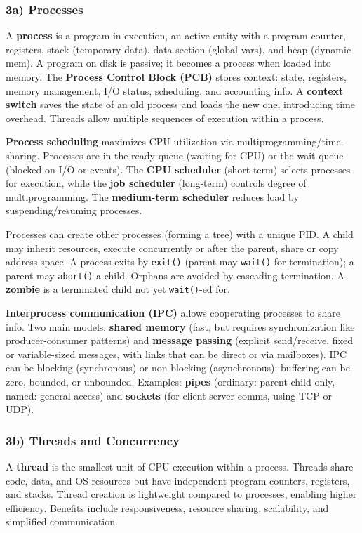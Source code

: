 \subsubsection*{3a) Processes}
A \textbf{process} is a program in execution, an active entity with a program counter, registers, stack (temporary data), data section (global vars), and heap (dynamic mem). A program on disk is passive; it becomes a process when loaded into memory. The \textbf{Process Control Block (PCB)} stores context: state, registers, memory management, I/O status, scheduling, and accounting info. A \textbf{context switch} saves the state of an old process and loads the new one, introducing time overhead. Threads allow multiple sequences of execution within a process.

\textbf{Process scheduling} maximizes CPU utilization via multiprogramming/time-sharing. Processes are in the ready queue (waiting for CPU) or the wait queue (blocked on I/O or events). The \textbf{CPU scheduler} (short-term) selects processes for execution, while the \textbf{job scheduler} (long-term) controls degree of multiprogramming. The \textbf{medium-term scheduler} reduces load by suspending/resuming processes.

Processes can create other processes (forming a tree) with a unique PID. A child may inherit resources, execute concurrently or after the parent, share or copy address space. A process exits by \texttt{exit()} (parent may \texttt{wait()} for termination); a parent may \texttt{abort()} a child. Orphans are avoided by cascading termination. A \textbf{zombie} is a terminated child not yet \texttt{wait()}-ed for.

\textbf{Interprocess communication (IPC)} allows cooperating processes to share info. Two main models: \textbf{shared memory} (fast, but requires synchronization like producer-consumer patterns) and \textbf{message passing} (explicit send/receive, fixed or variable-sized messages, with links that can be direct or via mailboxes). IPC can be blocking (synchronous) or non-blocking (asynchronous); buffering can be zero, bounded, or unbounded. Examples: \textbf{pipes} (ordinary: parent-child only, named: general access) and \textbf{sockets} (for client-server comms, using TCP or UDP).


\subsubsection*{3b) Threads and Concurrency}

A \textbf{thread} is the smallest unit of CPU execution within a process. Threads share code, data, and OS resources but have independent program counters, registers, and stacks. Thread creation is lightweight compared to processes, enabling higher efficiency. Benefits include responsiveness, resource sharing, scalability, and simplified communication.

